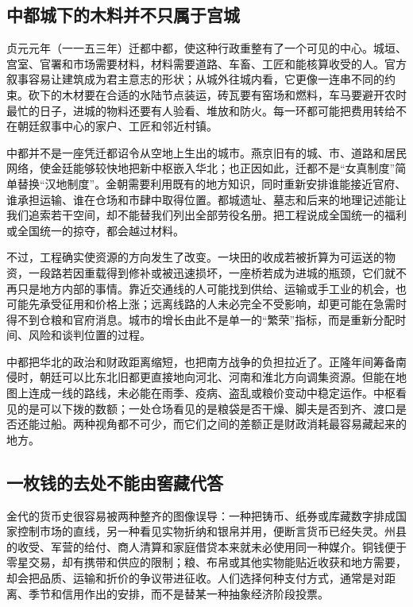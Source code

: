 \subsection{中都城下的木料并不只属于宫城}

贞元元年（一一五三年）迁都中都，使这种行政重整有了一个可见的中心。城垣、宫室、官署和市场需要材料，材料需要道路、车畜、工匠和能核算收受的人。官方叙事容易让建筑成为君主意志的形状；从城外往城内看，它更像一连串不同的约束。砍下的木材要在合适的水陆节点装运，砖瓦要有窑场和燃料，车马要避开农时最忙的日子，进城的物料还要有人验看、堆放和防火。每一环都可能把费用转给不在朝廷叙事中心的家户、工匠和邻近村镇。

中都并不是一座凭迁都诏令从空地上生出的城市。燕京旧有的城、市、道路和居民网络，使金廷能够较快地把新中枢嵌入华北；也正因如此，迁都不是“女真制度”简单替换“汉地制度”。金朝需要利用既有的地方知识，同时重新安排谁能接近官府、谁承担运输、谁在仓场和市肆中取得位置。都城遗址、墓志和后来的地理记述能让我们追索若干空间，却不能替我们列出全部劳役名册。把工程说成全国统一的福利或全国统一的掠夺，都会越过材料。

不过，工程确实使资源的方向发生了改变。一块田的收成若被折算为可运送的物资，一段路若因重载得到修补或被迅速损坏，一座桥若成为进城的瓶颈，它们就不再只是地方内部的事情。靠近交通线的人可能找到供给、运输或手工业的机会，也可能先承受征用和价格上涨；远离线路的人未必完全不受影响，却更可能在急需时得不到仓粮和官府消息。城市的增长由此不是单一的“繁荣”指标，而是重新分配时间、风险和谈判位置的过程。

中都把华北的政治和财政距离缩短，也把南方战争的负担拉近了。正隆年间筹备南侵时，朝廷可以比东北旧都更直接地向河北、河南和淮北方向调集资源。但能在地图上连成一线的路线，未必能在雨季、疫病、盗乱或粮价变动中稳定运作。中枢看见的是可以下拨的数额；一处仓场看见的是粮袋是否干燥、脚夫是否到齐、渡口是否还能过船。两种视角都不可少，而它们之间的差额正是财政消耗最容易藏起来的地方。

\subsection{一枚钱的去处不能由窖藏代答}

金代的货币史很容易被两种整齐的图像误导：一种把铸币、纸券或库藏数字排成国家控制市场的直线，另一种看见实物折纳和银帛并用，便断言货币已经失灵。州县的收受、军营的给付、商人清算和家庭借贷本来就未必使用同一种媒介。铜钱便于零星交易，却有携带和供应的限制；粮、布帛或其他实物能贴近收获和地方需要，却会把品质、运输和折价的争议带进征收。人们选择何种支付方式，通常是对距离、季节和信用作出的安排，而不是替某一种抽象经济阶段投票。

